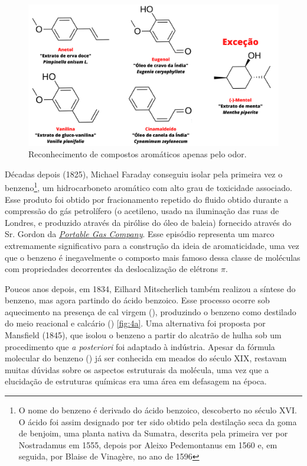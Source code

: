 \begin{figure}[htb]
\label{fig:4}
	\caption{Reconhecimento de compostos aromáticos apenas pelo odor.}
	\begin{center}
		\includegraphics[width=1\textwidth]{images/MOs(1).png}
	\end{center}
\end{figure}


Décadas depois (1825), Michael Faraday\autocite{Faraday1925, Wilson2012, Martin2015} conseguiu isolar pela primeira vez o benzeno\footnote{O nome do benzeno é derivado do ácido benzoico, descoberto no século XVI. O ácido foi assim designado por ter sido obtido pela destilação seca da goma de benjoim, uma planta nativa da Sumatra, descrita pela primeira ver por Nostradamus em 1555, depois por Aleixo Pedemontanus em 1560 e, em seguida, por Blaise de Vinagère, no ano de 1596}, um hidrocarboneto aromático com alto grau de toxicidade associado\autocite{Solomon1977}. Esse produto foi obtido por fracionamento repetido do fluido obtido durante a compressão do gás petrolífero (o acetileno, usado na iluminação das ruas de Londres, e produzido através da pirólise do óleo de baleia) fornecido através do Sr. Gordon da \href{https://portablegas.co.uk/}{\textit{Portable Gas Company}}. Esse episódio representa um marco extremamente significativo para a construção da ideia de aromaticidade, uma vez que o benzeno é inegavelmente o composto mais famoso dessa classe de moléculas com propriedades decorrentes da deslocalização de elétrons $\pi$\autocite{Faraday1825}. 

Poucos anos depois, em 1834, Eilhard Mitscherlich também realizou a síntese do benzeno, mas agora partindo do ácido benzoico. Esse processo ocorre sob aquecimento na presença de cal virgem (), produzindo o benzeno como destilado do meio reacional e calcário () \autoref{fig:4a}. Uma alternativa foi proposta por Mansfield (1845), que isolou o benzeno a partir do alcatrão de hulha sob um procedimento que \textit{a posteriori} foi adaptado à indústria. Apesar da fórmula molecular do benzeno () já ser conhecida em meados do século XIX, restavam muitas dúvidas sobre os aspectos estruturais da molécula, uma vez que a elucidação de estruturas químicas era uma área em defasagem na época. 


